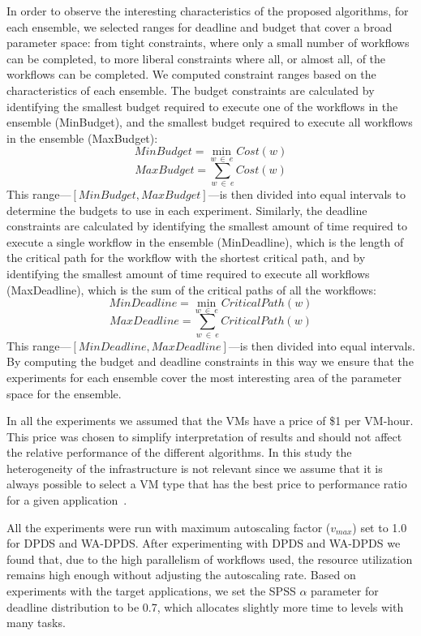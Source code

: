 \documentclass[preprint,5p]{elsarticle}
\begin{document}
In order to observe the interesting characteristics of the proposed algorithms,
for each ensemble, we selected ranges for deadline and budget that cover a broad
parameter space: from tight constraints, where only a small number of workflows can be completed,
to more liberal constraints where all, or almost all, of the workflows can be
completed. We computed constraint ranges based on
the characteristics of each ensemble. The budget constraints are calculated by
identifying the smallest budget required to execute one of the workflows in the
ensemble (MinBudget), and the smallest budget required to execute all workflows
in the ensemble (MaxBudget):
%
$$
MinBudget = \min_{w\ \in\ e}{Cost(w)}
$$
$$
MaxBudget = \sum_{w\ \in\ e}{Cost(w)}
$$
%
This range---$[MinBudget, MaxBudget]$---is then divided into equal intervals to
determine the budgets to use in each experiment. Similarly, the deadline
constraints are calculated by identifying the smallest amount
of time required to execute a single workflow in the ensemble (MinDeadline),
which is the length of the critical path for the workflow with the shortest
critical path, and by identifying the smallest amount of time required to
execute all workflows (MaxDeadline), which is the sum of the critical paths of
all the workflows:
%
$$
MinDeadline = \min_{w\ \in\ e}{CriticalPath(w)}
$$
$$
MaxDeadline = \sum_{w\ \in\ e}{CriticalPath(w)}
$$
%
This range---$[MinDeadline, MaxDeadline]$---is then divided into equal intervals. 
By computing the budget and deadline constraints in this way we ensure that the
experiments for each ensemble cover the most interesting area of the parameter space for the
ensemble.

In all the experiments we assumed that the VMs have a price of \$1 per VM-hour.
This price was chosen to simplify interpretation of results and should not
affect the relative performance of the different algorithms. In this study the
heterogeneity of the infrastructure is not relevant since we assume that it is
always possible to select a VM type that has the best price to performance ratio
for a given application~\cite{Juve2009}.

All the experiments were run with maximum autoscaling factor ($v_{max}$) set to
1.0 for DPDS and WA-DPDS. After experimenting with DPDS and WA-DPDS we found
that, due to the high parallelism of workflows used, the resource utilization
remains high enough without adjusting the autoscaling rate. Based on experiments
with the target applications, we set the SPSS $\alpha$ parameter for deadline
distribution to be 0.7, which allocates slightly more time to levels with many
tasks.
\end{document}
